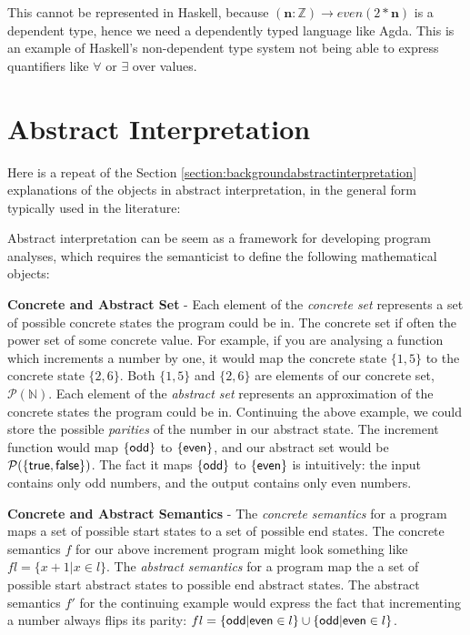\documentclass[12pt,twoside]{report}
\begin{document}
This cannot be represented in Haskell, because $(\textbf{n}: \mathbb{Z}) \rightarrow even(2 * \textbf{n})$ is a dependent type, hence we need a dependently typed language like Agda. This is an example of Haskell's non-dependent type system not being able to express quantifiers like $\forall$ or $\exists$ over values.



\section{Abstract Interpretation}
\label{appendix:backgroundabstractinterpretation}
Here is a repeat of the Section \ref{section:backgroundabstractinterpretation} explanations of the objects in abstract interpretation, in the general form typically used in the literature:

Abstract interpretation can be seem as a framework for developing program analyses, which requires the semanticist to define the following mathematical objects:

\textbf{Concrete and Abstract Set} - Each element of the \textit{concrete set} represents a set of possible concrete states the program could be in. The concrete set if often the power set of some concrete value. For example, if you are analysing a function which increments a number by one, it would map the concrete state $\{1, 5\}$ to the concrete state $\{2, 6\}$. Both $\{1, 5\}$ and $\{2, 6\}$ are  elements of our concrete set, $\mathcal{P}(\mathbb{N})$. Each element of the \textit{abstract set} represents an approximation of the concrete states the program could be in. Continuing the above example, we could store the possible \textit{parities} of the number in our abstract state. The increment function would map $\{ \mathsf{odd} \}$ to $\{ \mathsf{even} \}$, and our abstract set would be $\mathcal{P}({\{ \mathsf{true}, \mathsf{false} \}})$. The fact it maps $\{ \mathsf{odd} \}$ to $\{ \mathsf{even} \}$ is intuitively: the input contains only odd numbers, and the output contains only even numbers.

\textbf{Concrete and Abstract Semantics} - The \textit{concrete semantics} for a program maps a set of possible start states to a set of possible end states. The concrete semantics $f$ for our above increment program might look something like $f l = \{ x + 1 | x \in l \}$. The \textit{abstract semantics} for a program map the a set of possible start abstract states to possible end abstract states. The abstract semantics $f'$ for the continuing example would express the fact that incrementing a number always flips its parity: $f l = \{ \mathsf{odd} | \mathsf{even} \in l \} \cup \{ \mathsf{odd} | \mathsf{even} \in l \}$.
\end{document}
